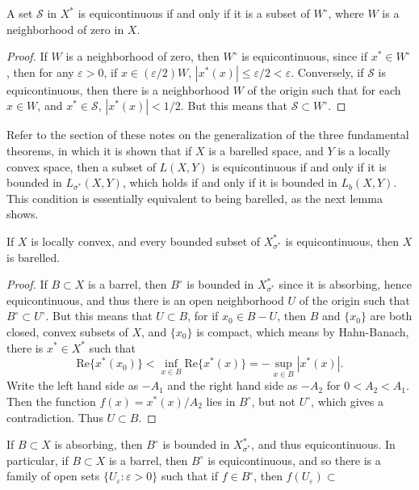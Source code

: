 \begin{theorem}
    A set $\mathcal{S}$ in $X^*$ is equicontinuous if and only if it is a subset of $W^\circ$, where $W$ is a neighborhood of zero in $X$.
\end{theorem}
\begin{proof}
    If $W$ is a neighborhood of zero, then $W^\circ$ is equicontinuous, since if $x^* \in W^\circ$, then for any $\varepsilon > 0$, if $x \in (\varepsilon/2) W$, $|x^*(x)| \leq \varepsilon/2 < \varepsilon$. Conversely, if $\mathcal{S}$ is equicontinuous, then there is a neighborhood $W$ of the origin such that for each $x \in W$, and $x^* \in \mathcal{S}$, $|x^*(x)| < 1/2$. But this means that $\mathcal{S} \subset W^\circ$.
\end{proof}

Refer to the section of these notes on the generalization of the three fundamental theorems, in which it is shown that if $X$ is a barelled space, and $Y$ is a locally convex space, then a subset of $L(X,Y)$ is equicontinuous if and only if it is bounded in $L_{\sigma^*}(X,Y)$, which holds if and only if it is bounded in $L_b(X,Y)$. This condition is essentially equivalent to being barelled, as the next lemma shows.

\begin{lemma}
    If $X$ is locally convex, and every bounded subset of $X^*_{\sigma^*}$ is equicontinuous, then $X$ is barelled.
\end{lemma}
\begin{proof}
    If $B \subset X$ is a barrel, then $B^\circ$ is bounded in $X^*_{\sigma^*}$ since it is absorbing, hence equicontinuous, and thus there is an open neighborhood $U$ of the origin such that $B^\circ \subset U^\circ$. But this means that $U \subset B$, for if $x_0 \in B - U$, then $B$ and $\{ x_0 \}$ are both closed, convex subsets of $X$, and $\{ x_0 \}$ is compact, which means by Hahn-Banach, there is $x^* \in X^*$ such that
    \[ \text{Re} \{ x^*(x_0) \} < \inf_{x \in B} \text{Re} \{ x^*(x) \} = - \sup_{x \in B} |x^*(x)|. \]
    Write the left hand side as $-A_1$ and the right hand side as $-A_2$ for $0 < A_2 < A_1$. Then the function $f(x) = x^*(x) / A_2$ lies in $B^\circ$, but not $U^\circ$, which gives a contradiction. Thus $U \subset B$.
\end{proof}

If $B \subset X$ is absorbing, then $B^\circ$ is bounded in $X^*_{\sigma^*}$, and thus equicontinuous. In particular, if $B \subset X$ is a barrel, then $B^\circ$ is equicontinuous, and so there is a family of open sets $\{ U_\varepsilon : \varepsilon > 0 \}$ such that if $f \in B^\circ$, then $f(U_\varepsilon) \subset$

